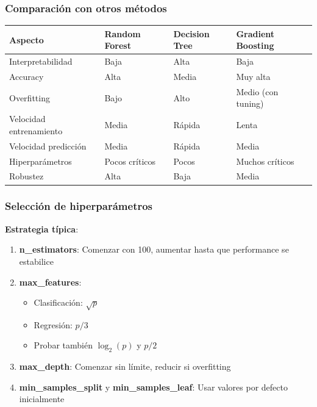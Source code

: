 \documentclass[
  doc,
  floatsintext,
  longtable,
  a4paper,
  nolmodern,
  notxfonts,
  notimes,
  12pt,
  colorlinks=true,linkcolor=blue,citecolor=blue,urlcolor=blue]{apa7}
\providecommand{\tightlist}{%
  \setlength{\itemsep}{0pt}\setlength{\parskip}{0pt}}
\newcounter{none} %
\begin{document}
\subsubsection{Comparación con otros
métodos}\label{comparaciuxf3n-con-otros-muxe9todos-1}

{\def\LTcaptype{none} %
\begin{longtable}[]{@{}llll@{}}
\toprule\noalign{}
Aspecto & Random Forest & Decision Tree & Gradient Boosting \\
\midrule\noalign{}
\endhead
\bottomrule\noalign{}
\endlastfoot
Interpretabilidad & Baja & Alta & Baja \\
Accuracy & Alta & Media & Muy alta \\
Overfitting & Bajo & Alto & Medio (con tuning) \\
Velocidad entrenamiento & Media & Rápida & Lenta \\
Velocidad predicción & Media & Rápida & Media \\
Hiperparámetros & Pocos críticos & Pocos & Muchos críticos \\
Robustez & Alta & Baja & Media \\
\end{longtable}
}

\subsubsection{Selección de
hiperparámetros}\label{selecciuxf3n-de-hiperparuxe1metros}

\textbf{Estrategia típica}:

\begin{enumerate}
\def\labelenumi{\arabic{enumi}.}
\item
  \textbf{n\_estimators}: Comenzar con 100, aumentar hasta que
  performance se estabilice
\item
  \textbf{max\_features}:

  \begin{itemize}
  \tightlist
  \item
    Clasificación: \(\sqrt{p}\)
  \item
    Regresión: \(p/3\)
  \item
    Probar también \(\log_2(p)\) y \(p/2\)
  \end{itemize}
\item
  \textbf{max\_depth}: Comenzar sin límite, reducir si overfitting
\item
  \textbf{min\_samples\_split} y \textbf{min\_samples\_leaf}: Usar
  valores por defecto inicialmente
\end{enumerate}
\end{document}
